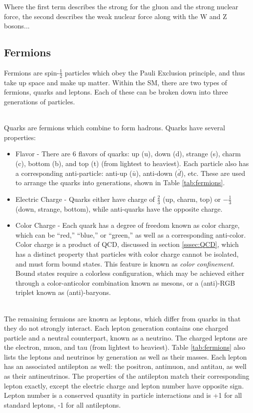         Where the first term describes the strong for the gluon and the strong nuclear force, the second describes the weak nuclear force along with the W and Z bosons... 




        \subsection{Fermions}
        Fermions are spin-$\frac{1}{2}$ particles which obey the Pauli Exclusion principle, and thus take up space and make up matter. Within the \gls{SM}, there are two types of fermions, quarks and leptons. Each of these can be broken down into three generations of particles.

        \\
        \indent Quarks are fermions which combine to form hadrons. Quarks have several properties:
        \begin{itemize}
            \item Flavor - There are 6 flavors of quarks: up (u), down (d), strange (s), charm (c), bottom (b), and top (t) (from lightest to heaviest). Each particle also has a corresponding anti-particle: anti-up ($\bar{u}$), anti-down ($\bar{d}$), etc. These are used to arrange the quarks into generations, shown in Table \ref{tab:fermions}.
            \item Electric Charge - Quarks either have charge of $\frac{2}{3}$ (up, charm, top) or $-\frac{1}{3}$ (down, strange, bottom), while anti-quarks have the opposite charge. 
            \item Color Charge - Each quark has a degree of freedom known as color charge, which can be ``red,'' ``blue,'' or ``green,'' as well as a corresponding anti-color. Color charge is a product of \gls{QCD}, discussed in section \ref{sssec:QCD}, which has a distinct property that particles with color charge cannot be isolated, and must form bound states. This feature is known as \textit{color confinement}. Bound states require a colorless configuration, which may be achieved either through a color-anticolor combination known as mesons, or a (anti)-RGB triplet known as (anti)-baryons. 
        \end{itemize}

        \\
        \indent The remaining fermions are known as leptons, which differ from quarks in that they do not strongly interact. Each lepton generation contains one charged particle and a neutral counterpart, known as a neutrino. The charged leptons are the electron, muon, and tau (from lightest to heaviest). Table \ref{tab:fermions} also lists the leptons and neutrinos by generation as well as their masses. Each lepton has an associated antilepton as well: the positron, antimuon, and antitau, as well as their antineutrinos. The properties of the antilepton match their corresponding lepton exactly, except the electric charge and lepton number have opposite sign. Lepton number is a conserved quantity in particle interactions and is +1 for all standard leptons, -1 for all antileptons.

